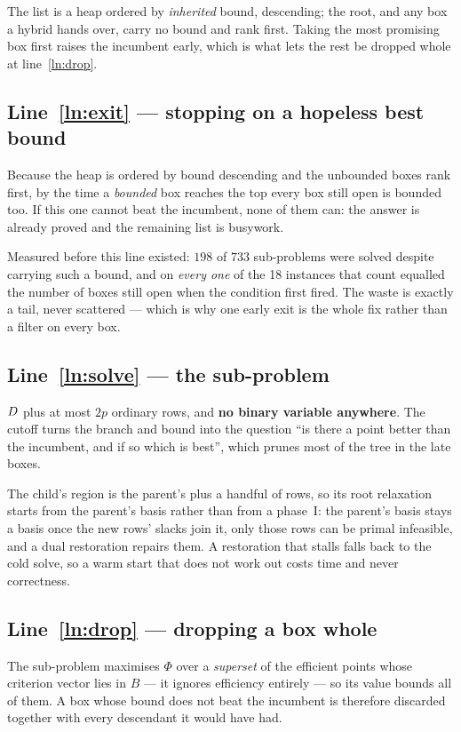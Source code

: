 \documentclass[11pt,a4paper]{article}
\begin{document}
The list is a heap ordered by \emph{inherited} bound, descending; the root, and
any box a hybrid hands over, carry no bound and rank first.  Taking the most
promising box first raises the incumbent early, which is what lets the rest be
dropped whole at line~\ref{ln:drop}.

\subsection{Line~\ref{ln:exit} --- stopping on a hopeless best bound}

Because the heap is ordered by bound descending and the unbounded boxes rank
first, by the time a \emph{bounded} box reaches the top every box still open is
bounded too.  If this one cannot beat the incumbent, none of them can: the
answer is already proved and the remaining list is busywork.

Measured before this line existed: $198$ of $733$ sub-problems were solved
despite carrying such a bound, and on \emph{every one} of the 18 instances that
count equalled the number of boxes still open when the condition first fired.
The waste is exactly a tail, never scattered --- which is why one early exit is
the whole fix rather than a filter on every box.

\subsection{Line~\ref{ln:solve} --- the sub-problem}

$D$ plus at most $2p$ ordinary rows, and \textbf{no binary variable
anywhere}.  The cutoff turns the branch and bound into the question ``is there
a point better than the incumbent, and if so which is best'', which prunes most
of the tree in the late boxes.

The child's region is the parent's plus a handful of rows, so its root
relaxation starts from the parent's basis rather than from a phase~I: the
parent's basis stays a basis once the new rows' slacks join it, only those rows
can be primal infeasible, and a dual restoration repairs them.  A restoration
that stalls falls back to the cold solve, so a warm start that does not work
out costs time and never correctness.

\subsection{Line~\ref{ln:drop} --- dropping a box whole}

The sub-problem maximises $\Phi$ over a \emph{superset} of the efficient points
whose criterion vector lies in $B$ --- it ignores efficiency entirely --- so its
value bounds all of them.  A box whose bound does not beat the incumbent is
therefore discarded together with every descendant it would have had.
\end{document}
